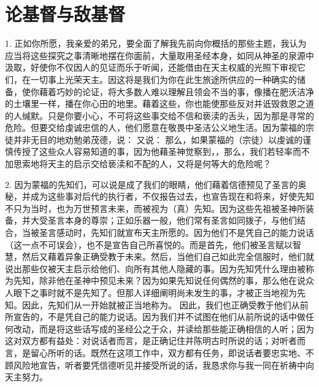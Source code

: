 
\chapter{论基督与敌基督}


1. 正如你所愿，我亲爱的弟兄，要全面了解我先前向你概括的那些主题，我认为应当将这些探究之事清晰地摆在你面前，大量取用圣经本身，如同从神圣的泉源中汲取，好使你不仅因人的见证而乐于听闻，还能借由在天主权威的光照下审视它们，在一切事上光荣天主。因这将是我们为你在此生旅途所供应的一种确实的储备，使你藉着巧妙的论证，将大多数人难以理解且领会不当的事，像播在肥沃洁净的土壤里一样，播在你心田的地里。藉着这些，你也能使那些反对并诋毁救恩之道的人缄默。只是你要小心，不可将这些事交给不信和亵渎的舌头，因为那是寻常的危险。但要交给虔诚忠信的人，他们愿意在敬畏中圣洁公义地生活。因为蒙福的宗徒并非无目的地劝勉弟茂德，说： 又说： 那么，如果蒙福的（宗徒）以虔诚的谨慎传授了这些众人容易知道的事，因为他藉圣神觉察到，，那么，我们若轻率而不加思索地将天主的启示交给亵渎和不配的人，又将是何等大的危险呢？\par

2. 因为蒙福的先知们，可以说是成了我们的眼睛，他们藉着信德预见了圣言的奥秘，并成为这些事对后代的执行者，不仅报告过去，也宣告现在和将来，好使先知不只为当时，也为万世预言未来，而被视为（真）先知。因为这些先祖被圣神所装备，并大受圣言本身的尊崇；正如乐器一般，他们常有圣言如同拨子，与他们结合，当被圣言感动时，先知们就宣布天主所愿的。因为他们不是凭自己的能力说话（这一点不可误会），也不是宣告自己所喜悦的。而是首先，他们被圣言赋以智慧，然后又藉着异象正确受教于未来。然后，当他们自己如此完全信服时，他们就说出那些仅被天主启示给他们、向所有其他人隐藏的事。因为先知凭什么理由被称为先知，除非他在圣神中预见未来？因为如果先知说任何偶然的事，那么他在说众人眼下之事时就不是先知了。但那人详细阐明尚未发生的事，才被正当地视为先知。因此，先知们从一开始就被正当地称为。 因此，我们也正确受教于他们从前所宣告的，不是凭自己的能力说话。因为我们并不试图在他们从前所说的话中做任何改动，而是将这些话写成的圣经公之于众，并读给那些能正确相信的人听；因为这对双方都有益处：对说话者而言，是正确记住并陈明古时所说的话；对听者而言，是留心所听的话。既然在这项工作中，双方都有任务，即说话者要忠实地、不顾风险地宣告，听者要凭信德听见并接受所说的话，我恳求你与我一同在祈祷中向天主努力。\par

